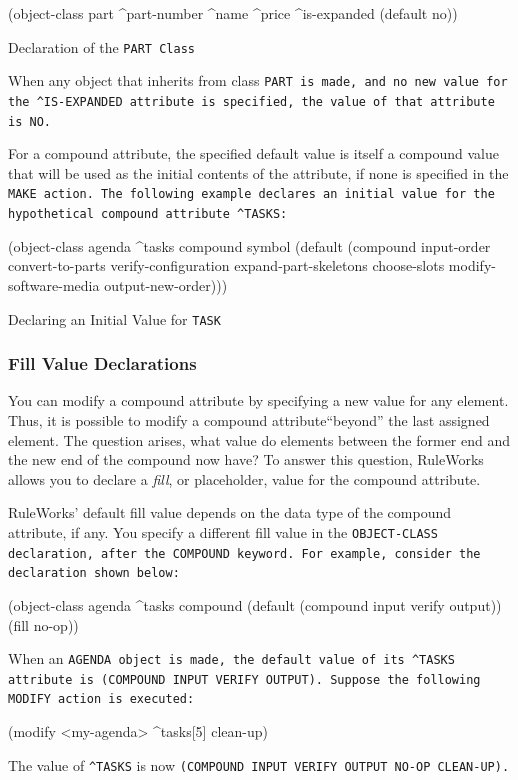 \begin{example}[h]
\begin{qv}
(object-class part
    ^part-number
    ^name
    ^price 
    ^is-expanded (default no))
\end{qv}
\caption{Declaration of the \tt{PART} Class}
\end{example}

When any object that inherits from class \tt{PART} is made, and no
new value for the \verb|^IS-EXPANDED| attribute is specified, the
value of that attribute is \tt{NO}.

For a compound attribute, the specified default value is
itself a compound value that will be used as the initial
contents of the attribute, if none is specified in the \tt{MAKE}
action. The following example declares an initial value for
the hypothetical compound attribute \verb|^TASKS|:

\begin{example}
\begin{qv}
(object-class agenda
    ^tasks compound symbol
       (default (compound input-order
                          convert-to-parts
                          verify-configuration
                          expand-part-skeletons
                          choose-slots
                          modify-software-media
                          output-new-order)))
\end{qv}
\caption{Declaring an Initial Value for \ct\tt{TASK}}
\end{example}

\subsubsection*{Fill Value Declarations}

You can modify a compound attribute by specifying a new value for any
element. Thus, it is possible to modify a compound attribute``beyond''
the last assigned element. The question arises, what value do elements
between the former end and the new end of the compound now have? To
answer this question, RuleWorks allows you to declare a \emph{fill},
or placeholder, value for the compound attribute.

RuleWorks' default fill value depends on the data type of the compound
attribute, if any. You specify a different fill value in the
\tt{OBJECT-CLASS} declaration, after the \tt{COMPOUND} keyword. For
example, consider the declaration shown below:
\begin{qv}
(object-class agenda
    ^tasks compound
       (default (compound input verify output))
       (fill no-op))
\end{qv}
When an \tt{AGENDA} object is made, the default value of its
\verb|^TASKS| attribute is \tt{(COMPOUND INPUT VERIFY
  OUTPUT)}. Suppose the following \tt{MODIFY} action is executed:
\begin{qv}
(modify <my-agenda> ^tasks[5] clean-up)
\end{qv}
The value of \verb|^TASKS| is now \tt{(COMPOUND INPUT VERIFY OUTPUT
  NO-OP CLEAN-UP)}.

